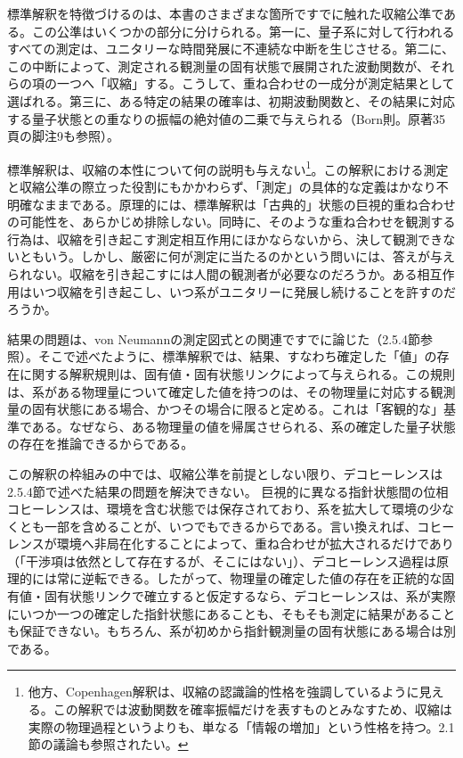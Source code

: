 標準解釈を特徴づけるのは、本書のさまざまな箇所ですでに触れた収縮公準である。この公準はいくつかの部分に分けられる。第一に、量子系に対して行われるすべての測定は、ユニタリーな時間発展に不連続な中断を生じさせる。第二に、この中断によって、測定される観測量の固有状態で展開された波動関数が、それらの項の一つへ「収縮」する。こうして、重ね合わせの一成分が測定結果として選ばれる。第三に、ある特定の結果の確率は、初期波動関数と、その結果に対応する量子状態との重なりの振幅の絶対値の二乗で与えられる（Born則。原著35頁の脚注9も参照）。

標準解釈は、収縮の本性について何の説明も与えない\footnote{他方、Copenhagen解釈は、収縮の認識論的性格を強調しているように見える。この解釈では波動関数を確率振幅だけを表すものとみなすため、収縮は実際の物理過程というよりも、単なる「情報の増加」という性格を持つ。2.1節の議論も参照されたい。}。この解釈における測定と収縮公準の際立った役割にもかかわらず、「測定」の具体的な定義はかなり不明確なままである。原理的には、標準解釈は「古典的」状態の巨視的重ね合わせの可能性を、あらかじめ排除しない。同時に、そのような重ね合わせを観測する行為は、収縮を引き起こす測定相互作用にほかならないから、決して観測できないともいう。しかし、厳密に何が測定に当たるのかという問いには、答えが与えられない。収縮を引き起こすには人間の観測者が必要なのだろうか。ある相互作用はいつ収縮を引き起こし、いつ系がユニタリーに発展し続けることを許すのだろうか。

結果の問題は、von Neumannの測定図式との関連ですでに論じた（2.5.4節参照）。そこで述べたように、標準解釈では、結果、すなわち確定した「値」の存在に関する解釈規則は、固有値・固有状態リンクによって与えられる。この規則は、系がある物理量について確定した値を持つのは、その物理量に対応する観測量の固有状態にある場合、かつその場合に限ると定める。これは「客観的な」基準である。なぜなら、ある物理量の値を帰属させられる、系の確定した量子状態の存在を推論できるからである。

この解釈の枠組みの中では、収縮公準を前提としない限り、デコヒーレンスは2.5.4節で述べた結果の問題を解決できない。
\hypertarget{srcpage:332}{}\label{srcpage:332}
巨視的に異なる指針状態間の位相コヒーレンスは、環境を含む状態では保存されており、系を拡大して環境の少なくとも一部を含めることが、いつでもできるからである。言い換えれば、コヒーレンスが環境へ非局在化することによって、重ね合わせが拡大されるだけであり（「干渉項は依然として存在するが、そこにはない」\cite[224頁]{ref007}）、デコヒーレンス過程は原理的には常に逆転できる。したがって、物理量の確定した値の存在を正統的な固有値・固有状態リンクで確立すると仮定するなら、デコヒーレンスは、系が実際にいつか一つの確定した指針状態にあることも、そもそも測定に結果があることも保証できない。もちろん、系が初めから指針観測量の固有状態にある場合は別である。

